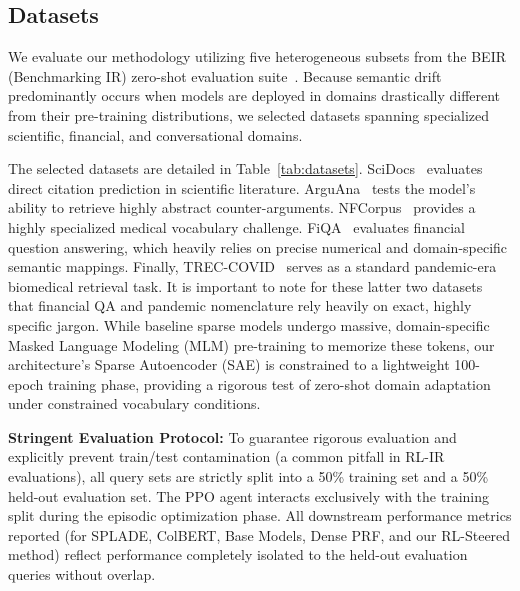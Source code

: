 \subsection{Datasets}
We evaluate our methodology utilizing five heterogeneous subsets from the BEIR (Benchmarking IR) zero-shot evaluation suite~\citep{thakur2021}. Because semantic drift predominantly occurs when models are deployed in domains drastically different from their pre-training distributions, we selected datasets spanning specialized scientific, financial, and conversational domains.

The selected datasets are detailed in Table~\ref{tab:datasets}. SciDocs~\citep{cohan2020} evaluates direct citation prediction in scientific literature. ArguAna~\citep{wachsmuth2018} tests the model's ability to retrieve highly abstract counter-arguments. NFCorpus~\citep{boteva2016} provides a highly specialized medical vocabulary challenge. FiQA~\citep{maia2018} evaluates financial question answering, which heavily relies on precise numerical and domain-specific semantic mappings. Finally, TREC-COVID~\citep{voorhees2021} serves as a standard pandemic-era biomedical retrieval task. It is important to note for these latter two datasets that financial QA and pandemic nomenclature rely heavily on exact, highly specific jargon. While baseline sparse models undergo massive, domain-specific Masked Language Modeling (MLM) pre-training to memorize these tokens, our architecture's Sparse Autoencoder (SAE) is constrained to a lightweight 100-epoch training phase, providing a rigorous test of zero-shot domain adaptation under constrained vocabulary conditions.

\textbf{Stringent Evaluation Protocol:} To guarantee rigorous evaluation and explicitly prevent train/test contamination (a common pitfall in RL-IR evaluations), all query sets are strictly split into a 50\% training set and a 50\% held-out evaluation set. The PPO agent interacts exclusively with the training split during the episodic optimization phase. All downstream performance metrics reported (for SPLADE, ColBERT, Base Models, Dense PRF, and our RL-Steered method) reflect performance completely isolated to the held-out evaluation queries without overlap.

